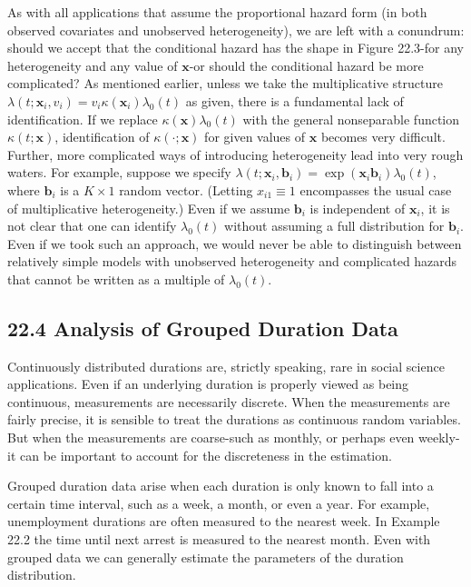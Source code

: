 \documentclass[10pt]{article}
\begin{document}
As with all applications that assume the proportional hazard form (in both observed covariates and unobserved heterogeneity), we are left with a conundrum: should we accept that the conditional hazard has the shape in Figure 22.3-for any heterogeneity and any value of $\mathbf{x}$-or should the conditional hazard be more complicated? As mentioned earlier, unless we take the multiplicative structure $\lambda\left(t ; \mathbf{x}_{i}, v_{i}\right)=v_{i} \kappa\left(\mathbf{x}_{i}\right) \lambda_{0}(t)$ as given, there is a fundamental lack of identification. If we replace $\kappa(\mathbf{x}) \lambda_{0}(t)$ with the general nonseparable function $\kappa(t ; \mathbf{x})$, identification of $\kappa(\cdot ; \mathbf{x})$ for given values of $\mathbf{x}$ becomes very difficult. Further, more complicated ways of introducing heterogeneity lead into very rough waters. For example, suppose we specify $\lambda\left(t ; \mathbf{x}_{i}, \mathbf{b}_{i}\right)=\exp \left(\mathbf{x}_{i} \mathbf{b}_{i}\right) \lambda_{0}(t)$, where $\mathbf{b}_{i}$ is a $K \times 1$ random vector. (Letting $x_{i 1} \equiv 1$ encompasses the usual case of multiplicative heterogeneity.) Even if we assume $\mathbf{b}_{i}$ is independent of $\mathbf{x}_{i}$, it is not clear that one can identify $\lambda_{0}(t)$ without assuming a full distribution for $\mathbf{b}_{i}$. Even if we took such an approach, we would never be able to distinguish between relatively simple models with unobserved heterogeneity and complicated hazards that cannot be written as a multiple of $\lambda_{0}(t)$.

\subsection*{22.4 Analysis of Grouped Duration Data}
Continuously distributed durations are, strictly speaking, rare in social science applications. Even if an underlying duration is properly viewed as being continuous, measurements are necessarily discrete. When the measurements are fairly precise, it is sensible to treat the durations as continuous random variables. But when the measurements are coarse-such as monthly, or perhaps even weekly-it can be important to account for the discreteness in the estimation.

Grouped duration data arise when each duration is only known to fall into a certain time interval, such as a week, a month, or even a year. For example, unemployment durations are often measured to the nearest week. In Example 22.2 the time until next arrest is measured to the nearest month. Even with grouped data we can generally estimate the parameters of the duration distribution.
\end{document}
